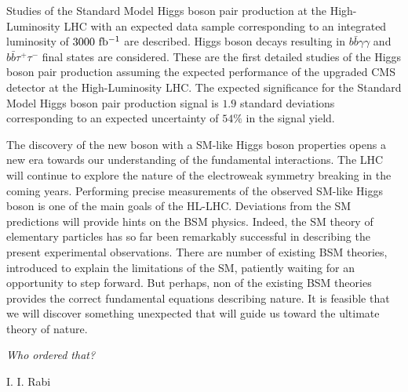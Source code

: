 Studies of the Standard Model Higgs boson pair production at the High-Luminosity LHC with an expected data sample corresponding to an integrated luminosity of $3000~\mathrm{fb^{-1}}$ are described. Higgs boson decays resulting in $b\bar{b}\gamma\gamma$ and $b\bar{b}\tau^{+}\tau^{-}$ final states are considered. These are the first detailed studies of the Higgs boson pair production assuming the expected performance of the upgraded CMS detector at the High-Luminosity LHC. The expected significance for the Standard Model Higgs boson pair production signal is $1.9$ standard deviations corresponding to an expected uncertainty of $54\%$ in the signal yield. 

The discovery of the new boson with a SM-like Higgs boson properties opens a new era towards our understanding of the fundamental interactions. The LHC will continue to explore the nature of the electroweak symmetry breaking in the coming years. Performing precise measurements of the observed SM-like Higgs boson is one of the main goals of the HL-LHC. Deviations from the SM predictions will provide hints on the BSM physics. Indeed, the SM theory of elementary particles has so far been remarkably successful in describing the present experimental observations. There are number of existing BSM theories, introduced to explain the limitations of the SM, patiently waiting for an opportunity to step forward. But perhaps, non of the existing BSM theories provides the correct fundamental equations describing nature. It is feasible that we will discover something unexpected that will guide us toward the ultimate theory of nature.

\epigraph{\textit{Who ordered that?}}{I. I. Rabi}


